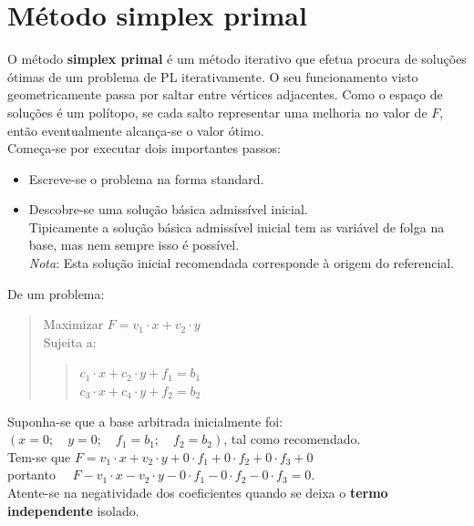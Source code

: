 \documentclass[]{report}
\begin{document}
\section{Método simplex primal}
O método \textbf{simplex primal} é um método iterativo que efetua procura de soluções ótimas de um problema de PL iterativamente. O seu funcionamento visto geometricamente passa por saltar entre vértices adjacentes. Como o espaço de soluções é um polítopo, se cada salto representar uma melhoria no valor de $F$, então eventualmente alcança-se o valor ótimo.\\
Começa-se por executar dois importantes passos:
\begin{itemize}
\item Escreve-se o problema na forma standard.
\item Descobre-se uma solução básica admissível inicial.\\
Tipicamente a solução básica admissível inicial tem as variável de folga na base, mas nem sempre isso é possível.\\
\textit{Nota}: Esta solução inicial recomendada corresponde à origem do referencial.
\end{itemize}
\noindent De um problema:
\begin{quotation}
\noindent Maximizar $F=v_1\cdot x +v_2\cdot y$\\
Sujeita a:
\begin{quotation}
\noindent $c_1\cdot x+c_2\cdot y + f_1 = b_1$\\
$c_3\cdot x+c_4\cdot y + f_2 = b_2$
\end{quotation}
\end{quotation}
Suponha-se que a base arbitrada inicialmente foi:\\
$(x=0;\quad y=0;\quad f_1=b_1;\quad f_2=b_2)$, tal como recomendado.\\[0.2cm]
Tem-se que $F=v_1\cdot x +v_2\cdot y+0\cdot f_1+0\cdot f_2+0\cdot f_3 + 0$\\
portanto $\quad F-v_1\cdot x -v_2\cdot y-0\cdot f_1-0\cdot f_2-0\cdot f_3 = 0$.\\
Atente-se na negatividade dos coeficientes quando se deixa o \textbf{termo independente} isolado.\\[0.2cm]
\end{document}
